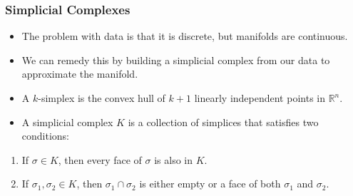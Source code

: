\documentclass{beamer}
\begin{document}
\begin{frame}%

\frametitle{Simplicial Complexes}

\begin{itemize}

\item The problem with data is that it is discrete, but manifolds are continuous.

\pause

\item We can remedy this by building a simplicial complex from our data to approximate the manifold.

\pause

\item A $k$-simplex is the convex hull of $k+1$ linearly independent points in $\mathbb{R}^n$.
\pause

\item A simplicial complex $K$ is a collection of simplices that satisfies two conditions:
\end{itemize}

\begin{enumerate}

\item If $\sigma \in K$, then every face of $\sigma$ is also in $K$.

\item If $\sigma_1, \sigma_2 \in K$, then $\sigma_1 \cap \sigma_2$ is either empty or a face of both
  $\sigma_1$ and $\sigma_2$.
\end{enumerate}


\end{frame}






\end{document}
